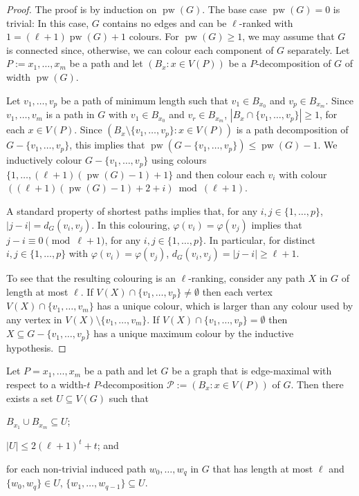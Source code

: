 \documentclass[kpfonts]{patmorin}
\DeclareMathOperator{\pw}{pw}
\theoremstyle{named}
\begin{document}
\begin{proof}
    The proof is by induction on $\pw(G)$.  The base case $\pw(G)=0$ is trivial: In this case, $G$ contains no edges and can be $\ell$-ranked with $1 = (\ell+1)\pw(G)+1$ colours.   For $\pw(G)\ge 1$, we may assume that $G$ is connected since, otherwise, we can colour each component of $G$ separately. Let $P:=x_1,\ldots,x_m$ be a path and let $(B_x:x\in V(P))$ be a $P$-decomposition of $G$ of width $\pw(G)$.

    Let $v_1,\ldots,v_p$ be a path of minimum length such that $v_1\in B_{x_0}$ and $v_p\in B_{x_m}$.  Since $v_1,\ldots,v_m$ is a path in $G$ with $v_1\in B_{x_0}$ and $v_r\in B_{x_m}$,  $|B_x\cap\{v_1,\ldots,v_p\}|\ge 1$, for each $x\in V(P)$.  Since $(B_x\setminus\{v_1,\ldots,v_p\}:x\in V(P))$ is a path decomposition of $G-\{v_1,\ldots,v_p\}$, this implies that $\pw(G-\{v_1,\ldots,v_p\})\le \pw(G)-1$.  We inductively colour $G-\{v_1,\ldots,v_p\}$ using colours $\{1,\ldots,(\ell+1)(\pw(G)-1)+1\}$ and then colour each $v_i$ with colour $((\ell+1)(\pw(G)-1)+2+i)\bmod (\ell+1)$.

    A standard property of shortest paths implies that, for any $i,j\in\{1,\ldots,p\}$, $|j-i|=d_G(v_i,v_j)$. In this colouring, $\varphi(v_i)=\varphi(v_j)$ implies that $j-i\equiv 0\pmod{\ell+1}$, for any $i,j\in\{1,\ldots,p\}$.  In particular, for distinct $i,j\in\{1,\ldots,p\}$ with $\varphi(v_i)=\varphi(v_j)$, $d_G(v_i,v_j) = |j-i|\ge\ell+1$.

    To see that the resulting colouring is an $\ell$-ranking, consider any path $X$ in $G$ of length at most $\ell$. If $V(X)\cap\{v_1,\ldots,v_p\}\neq\emptyset$ then each vertex $V(X)\cap\{v_1,\ldots,v_m\}$ has a unique colour, which is larger than any colour used by any vertex in $V(X)\setminus\{v_1,\ldots,v_m\}$.  If $V(X)\cap\{v_1,\ldots,v_p\}=\emptyset$ then $X\subseteq G-\{v_1,\ldots,v_p\}$ has a unique maximum colour by the inductive hypothesis.
\end{proof}

\begin{lem}\label{path-induced}
    Let $P=x_1,\ldots,x_m$ be a path and let $G$ be a graph that is edge-maximal with respect to a width-$t$ $P$-decomposition $\mathcal{P}:=(B_x:x\in V(P))$ of $G$.  Then there exists a set $U\subseteq V(G)$ such that
    \begin{compactenum}[(Z1)]
        \item $B_{x_1}\cup B_{x_m}\subseteq U$;\label{values-u}
        \item $|U|\le 2(\ell+1)^t + t$; and \label{size-u}
        \item for each non-trivial induced path $w_0,\ldots,w_q$ in $G$ that has length at most $\ell$ and $\{w_0,w_q\}\in U$, $\{w_1,\ldots,w_{q-1}\}\subseteq U$.\label{induced-u}
    \end{compactenum}
\end{lem}
\end{document}
